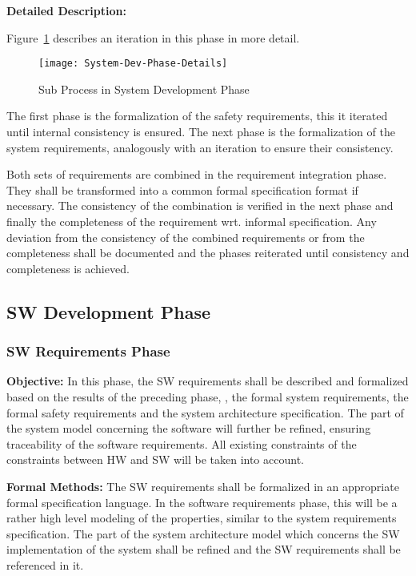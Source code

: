 {\bf Detailed Description:}

Figure~\ref{fig:detailed-sys-dev-phase} describes an iteration in this phase in
more detail.

\begin{figure}[ht]
  \centering
  \texttt{[image: System-Dev-Phase-Details]}
  \caption{Sub Process in System Development Phase}
  \label{fig:detailed-sys-dev-phase}
\end{figure}

The first phase is the formalization of the safety requirements, this it
iterated until internal consistency is ensured. The next phase is the
formalization of the system requirements, analogously with an iteration to
ensure their consistency.

Both sets of requirements are combined in the requirement integration
phase. They shall be transformed into a common formal specification format if
necessary. The consistency of the combination is verified in the next phase and
finally the completeness of the requirement wrt. informal specification. Any
deviation from the consistency of the combined requirements or from the
completeness shall be documented and the phases reiterated until consistency and
completeness is achieved.


\subsection{SW Development Phase}
\label{sec:sw-development-phase}

\subsubsection{SW Requirements Phase}
\label{sec:sw-requ-phase}

{\bf Objective:} In this phase, the SW requirements shall be described and
formalized based on the results of the preceding phase, \ie, the formal system
requirements, the formal safety requirements and the system architecture
specification. The part of the system model concerning the software will further
be refined, ensuring traceability of the software requirements. All existing
constraints of the constraints between HW and SW will be taken into account.

{\bf Formal Methods:} The SW requirements shall be formalized in an appropriate
formal specification language. In the software requirements phase, this will be
a rather high level modeling of the properties, similar to the system
requirements specification. The part of the system architecture model which
concerns the SW implementation of the system shall be refined and the SW
requirements shall be referenced in it.

